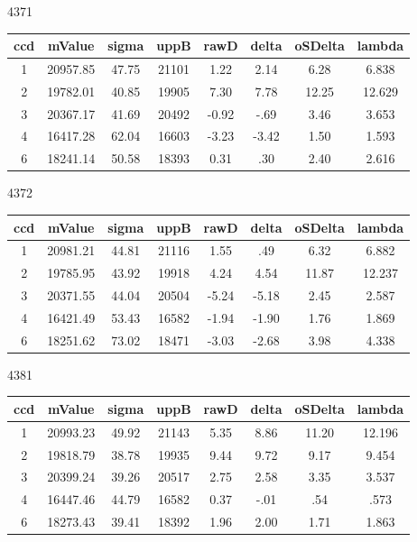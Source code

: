 \documentclass[11pt]{book}
\begin{document}
 
4371
\begin{table}[!h]
\centering
\begin{tabular}{|c |c |c |c |c |c |c |c |}
\hline ccd & mValue & sigma & uppB & rawD & delta & oSDelta & lambda \\
\hline 1 & 20957.85 & 47.75 & 21101 & 1.22 & 2.14 & 6.28 & 6.838 \\
\hline 2 & 19782.01 & 40.85 & 19905 & 7.30 & 7.78 & 12.25 & 12.629 \\
\hline 3 & 20367.17 & 41.69 & 20492 & -0.92 & -.69 & 3.46 & 3.653 \\
\hline 4 & 16417.28 & 62.04 & 16603 & -3.23 & -3.42 & 1.50 & 1.593 \\
\hline 6 & 18241.14 & 50.58 & 18393 & 0.31 & .30 & 2.40 & 2.616 \\
\hline

\end{tabular}
\end{table}

4372
\begin{table}[!h]
\centering
\begin{tabular}{|c |c |c |c |c |c |c |c |}
\hline ccd & mValue & sigma & uppB & rawD & delta & oSDelta & lambda \\
\hline 1 & 20981.21 & 44.81 & 21116 & 1.55 & .49 & 6.32 & 6.882 \\
\hline 2 & 19785.95 & 43.92 & 19918 & 4.24 & 4.54 & 11.87 & 12.237 \\
\hline 3 & 20371.55 & 44.04 & 20504 & -5.24 & -5.18 & 2.45 & 2.587 \\
\hline 4 & 16421.49 & 53.43 & 16582 & -1.94 & -1.90 & 1.76 & 1.869 \\
\hline 6 & 18251.62 & 73.02 & 18471 & -3.03 & -2.68 & 3.98 & 4.338 \\
\hline

\end{tabular}
\end{table}

4381
\begin{table}[!h]
\centering
\begin{tabular}{|c |c |c |c |c |c |c |c |}
\hline ccd & mValue & sigma & uppB & rawD & delta & oSDelta & lambda \\
\hline 1 & 20993.23 & 49.92 & 21143 & 5.35 & 8.86 & 11.20 & 12.196 \\
\hline 2 & 19818.79 & 38.78 & 19935 & 9.44 & 9.72 & 9.17 & 9.454 \\
\hline 3 & 20399.24 & 39.26 & 20517 & 2.75 & 2.58 & 3.35 & 3.537 \\
\hline 4 & 16447.46 & 44.79 & 16582 & 0.37 & -.01 & .54 & .573 \\
\hline 6 & 18273.43 & 39.41 & 18392 & 1.96 & 2.00 & 1.71 & 1.863 \\
\hline

\end{tabular}
\end{table}
\end{document}
